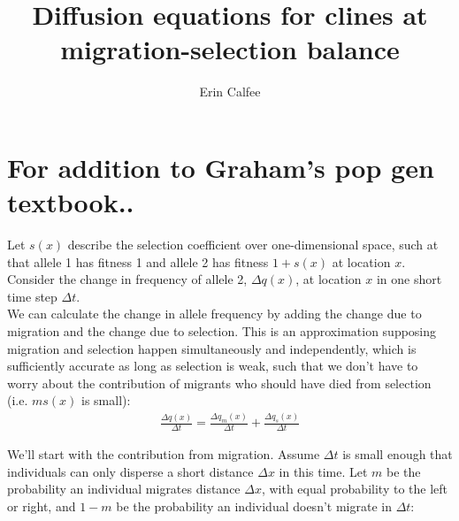 \documentclass{article}
\title{Diffusion equations for clines at migration-selection balance}
\author{Erin Calfee}
\begin{document}
\maketitle

\section{For addition to Graham's pop gen textbook..}

Let $s(x)$ describe the selection coefficient over one-dimensional space, such at that allele 1 has fitness 1 and allele 2 has fitness $1+ s(x)$ at location $x$. Consider the change in frequency of allele 2, $\Delta q(x)$, at location $x$ in one short time step $\Delta t$. \\
We can calculate the change in allele frequency by adding the change due to migration and the change due to selection. This is an approximation supposing migration and selection happen simultaneously and independently, which is sufficiently accurate as long as selection is weak, such that we don't have to worry about the contribution of migrants who should have died from selection (i.e. $ms(x)$ is small):
\begin{align*}
\frac{\Delta q(x)}{\Delta t} = \frac{\Delta q_{m}(x)}{\Delta t} + \frac{\Delta q_{s}(x)}{\Delta t}
\end{align*}

We'll start with the contribution from migration. Assume $\Delta t$ is small enough that individuals can only disperse a short distance $\Delta x$ in this time. Let $m$ be the probability an individual migrates distance $\Delta x$, with equal probability to the left or right, and $1-m$ be the probability an individual doesn't migrate in $\Delta t$:
\end{document}
